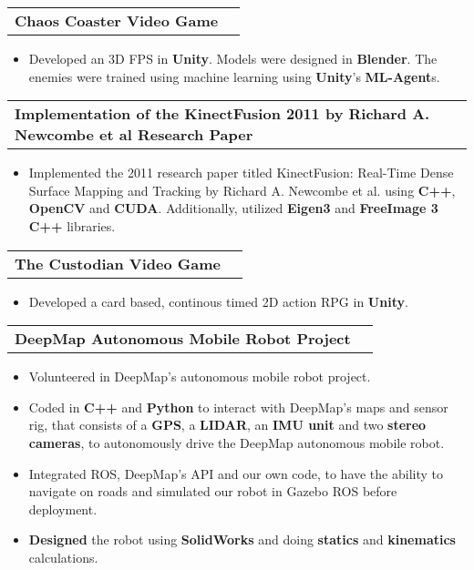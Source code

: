 \documentclass[letterpaper,11pt]{article}
\makeatletter
\newcommand{\resumeItem}[1]{
  \item\small{
    {#1 \vspace{-2pt}}
  }
}
\newcommand{\resumeProjectHeading}[2]{
    \item
    \begin{tabular*}{1.001\textwidth}{l@{\extracolsep{\fill}}r}
      \small#1 & \textbf{\small #2}\\
    \end{tabular*}\vspace{-7pt}
}
\newcommand{\resumeItemListStart}{\begin{itemize}}
\newcommand{\resumeItemListEnd}{\end{itemize}\vspace{-5pt}}
\makeatother
\begin{document}
  \vspace{-13pt} 
  \resumeProjectHeading
    {\textbf{\color{blue}Chaos Coaster Video Game}} {}
    \resumeItemListStart
      \resumeItem{Developed an 3D FPS in \textbf{Unity}. Models were designed in \textbf{Blender}. The enemies were trained using machine learning using \textbf{Unity}'s \textbf{ML-Agent}s.}
    \resumeItemListEnd

  \vspace{-13pt}
  \resumeProjectHeading
    {\textbf{\color{blue}Implementation of the KinectFusion 2011 by Richard A. Newcombe et al Research Paper}} {}
    \resumeItemListStart
      \resumeItem{Implemented the 2011 research paper titled KinectFusion: Real-Time Dense Surface Mapping and Tracking by Richard A. Newcombe et al. using \textbf{C++}, \textbf{OpenCV} and \textbf{CUDA}. Additionally, utilized \textbf{Eigen3} and \textbf{FreeImage 3} \textbf{C++} libraries.}
    \resumeItemListEnd 

  \vspace{-13pt}
  \resumeProjectHeading
    {\textbf{\color{blue}The Custodian Video Game}} {}
    \resumeItemListStart
      \resumeItem{Developed a card based, continous timed 2D action RPG in \textbf{Unity}.}
    \resumeItemListEnd 

  \vspace{-13pt}
  \resumeProjectHeading
    {\textbf{\color{blue}DeepMap Autonomous Mobile Robot Project}} {}
    \resumeItemListStart
      \resumeItem{Volunteered in DeepMap's autonomous mobile robot project.}
      \resumeItem{Coded in \textbf{C++} and \textbf{Python} to interact with DeepMap’s maps and sensor rig, that consists of a \textbf{GPS}, a \textbf{LIDAR}, an \textbf{IMU unit} and two \textbf{stereo cameras}, to autonomously drive the DeepMap autonomous mobile robot.}
      \resumeItem{Integrated ROS, DeepMap’s API and our own code, to have the ability to navigate on roads and simulated our robot in Gazebo ROS before deployment.}
      \resumeItem{\textbf{Designed} the robot using \textbf{SolidWorks} and doing \textbf{statics} and \textbf{kinematics} calculations.}
    \resumeItemListEnd
    
\end{document}
